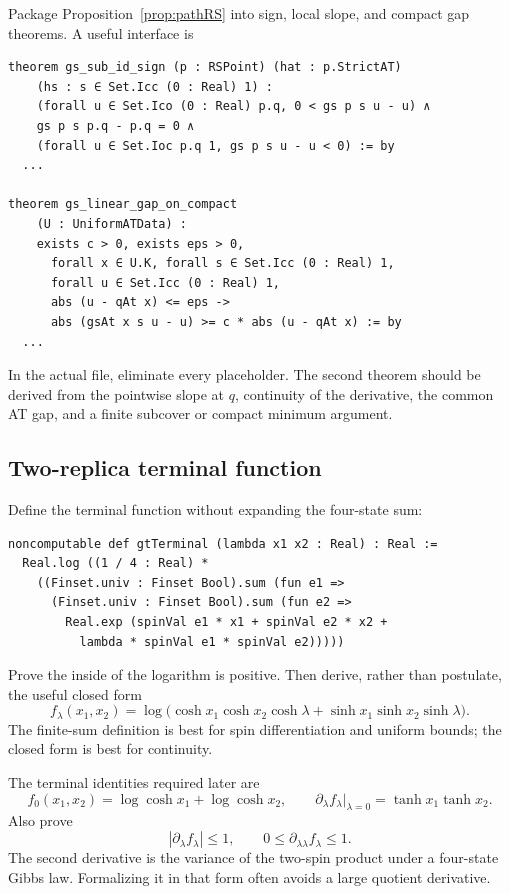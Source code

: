 \documentclass[11pt]{article}
\numberwithin{equation}{section}
\newcommand{\1}{\mathbf 1}
\begin{document}
Package Proposition~\ref{prop:pathRS} into sign, local slope, and compact
gap theorems.  A useful interface is
\begin{lstlisting}
theorem gs_sub_id_sign (p : RSPoint) (hat : p.StrictAT)
    (hs : s ∈ Set.Icc (0 : Real) 1) :
    (forall u ∈ Set.Ico (0 : Real) p.q, 0 < gs p s u - u) ∧
    gs p s p.q - p.q = 0 ∧
    (forall u ∈ Set.Ioc p.q 1, gs p s u - u < 0) := by
  ...

theorem gs_linear_gap_on_compact
    (U : UniformATData) :
    exists c > 0, exists eps > 0,
      forall x ∈ U.K, forall s ∈ Set.Icc (0 : Real) 1,
      forall u ∈ Set.Icc (0 : Real) 1,
      abs (u - qAt x) <= eps ->
      abs (gsAt x s u - u) >= c * abs (u - qAt x) := by
  ...
\end{lstlisting}
In the actual file, eliminate every placeholder.  The second theorem should
be derived from the pointwise slope at $q$, continuity of the derivative,
the common AT gap, and a finite subcover or compact minimum argument.

\subsection{Two-replica terminal function}

Define the terminal function without expanding the four-state sum:
\begin{lstlisting}
noncomputable def gtTerminal (lambda x1 x2 : Real) : Real :=
  Real.log ((1 / 4 : Real) *
    ((Finset.univ : Finset Bool).sum (fun e1 =>
      (Finset.univ : Finset Bool).sum (fun e2 =>
        Real.exp (spinVal e1 * x1 + spinVal e2 * x2 +
          lambda * spinVal e1 * spinVal e2)))))
\end{lstlisting}
Prove the inside of the logarithm is positive.  Then derive, rather than
postulate, the useful closed form
\[
 f_\lambda(x_1,x_2)
 =\log\bigl(
 \cosh x_1\cosh x_2\cosh\lambda
 +\sinh x_1\sinh x_2\sinh\lambda\bigr).
\]
The finite-sum definition is best for spin differentiation and uniform
bounds; the closed form is best for continuity.

The terminal identities required later are
\[
 f_0(x_1,x_2)=\log\cosh x_1+\log\cosh x_2,
 \qquad
 \partial_\lambda f_\lambda\big|_{\lambda=0}
 =\tanh x_1\tanh x_2.
\]
Also prove
\[
 |\partial_\lambda f_\lambda|\le1,\qquad
 0\le\partial_{\lambda\lambda}f_\lambda\le1.
\]
The second derivative is the variance of the two-spin product under a
four-state Gibbs law.  Formalizing it in that form often avoids a large
quotient derivative.
\end{document}
